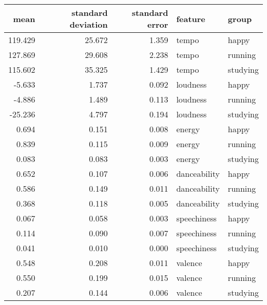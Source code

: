 \begin{tabular}{rrrll}
\toprule
   mean &  standard deviation &  standard error &      feature &    group \\
\midrule
119.429 &              25.672 &           1.359 &        tempo &    happy \\
127.869 &              29.608 &           2.238 &        tempo &  running \\
115.602 &              35.325 &           1.429 &        tempo & studying \\
 -5.633 &               1.737 &           0.092 &     loudness &    happy \\
 -4.886 &               1.489 &           0.113 &     loudness &  running \\
-25.236 &               4.797 &           0.194 &     loudness & studying \\
  0.694 &               0.151 &           0.008 &       energy &    happy \\
  0.839 &               0.115 &           0.009 &       energy &  running \\
  0.083 &               0.083 &           0.003 &       energy & studying \\
  0.652 &               0.107 &           0.006 & danceability &    happy \\
  0.586 &               0.149 &           0.011 & danceability &  running \\
  0.368 &               0.118 &           0.005 & danceability & studying \\
  0.067 &               0.058 &           0.003 &  speechiness &    happy \\
  0.114 &               0.090 &           0.007 &  speechiness &  running \\
  0.041 &               0.010 &           0.000 &  speechiness & studying \\
  0.548 &               0.208 &           0.011 &      valence &    happy \\
  0.550 &               0.199 &           0.015 &      valence &  running \\
  0.207 &               0.144 &           0.006 &      valence & studying \\
\bottomrule
\end{tabular}
